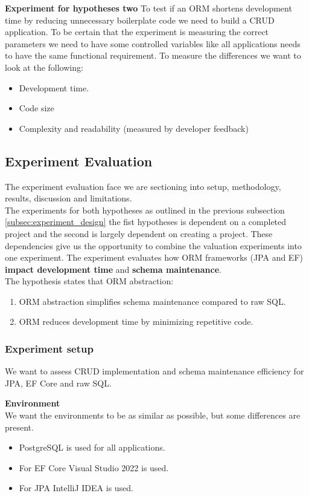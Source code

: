 \textbf{Experiment for hypotheses two}
To test if an ORM shortens development time by reducing unnecessary boilerplate code we need to build a CRUD application.
To be certain that the experiment is measuring the correct parameters we need to have some controlled variables like all applications needs to have the same functional requirement.
To measure the differences we want to look at the following:
\begin{itemize}
	\item Development time.
	\item Code size
	\item Complexity and readability (measured by developer feedback)
\end{itemize}

\subsection{Experiment Evaluation}
The experiment evaluation face we are sectioning into setup, methodology, results, discussion and limitations.\\
The experiments for both hypotheses as outlined in the previous subsection \ref{subsec:experiment_design} the fist hypotheses is dependent on a completed project and the second is largely dependent on creating a project.
These dependencies give us the opportunity to combine the valuation experiments into one experiment.
The experiment evaluates how ORM frameworks (JPA and EF) \textbf{impact development time}  and \textbf{schema maintenance}.\\ 
The hypothesis states that ORM abstraction:
\begin{enumerate}
	\item ORM abstraction simplifies schema maintenance compared to raw SQL.
	\item ORM reduces development time by minimizing repetitive code.
\end{enumerate}

\subsubsection{Experiment setup}
We want to assess CRUD implementation and schema maintenance efficiency for JPA, EF Core and raw SQL.

\textbf{Environment} \\
We want the environments to be as similar as possible, but some differences are present.
\begin{itemize}
	\item PostgreSQL is used for all applications.
	\item For EF Core Visual Studio 2022 is used.
	\item For JPA IntelliJ IDEA is used.
\end{itemize}

